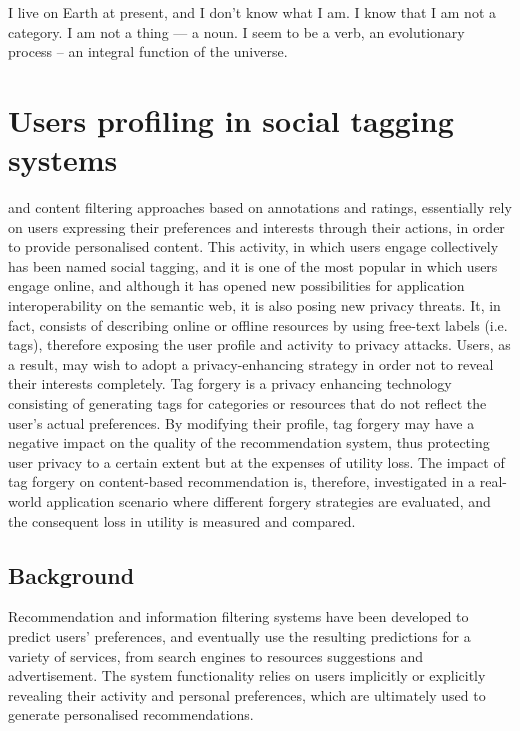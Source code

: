 \begin{savequote}[75mm] 
I live on Earth at present, and I don’t know what I am. I know that I am not a category. I am not a thing — a noun. I seem to be a verb, an evolutionary process – an integral function of the universe.
\end{savequote}

\chapter{Users profiling in social tagging systems}

 and content filtering approaches based on annotations and ratings, essentially rely on users expressing their preferences and interests through their actions, in order to provide personalised content. This activity, in which users engage collectively has been named social tagging, and it is one of the most popular in which users engage online, and although it has opened new possibilities for application interoperability on the semantic web, it is also posing new privacy threats. It, in fact, consists of describing online or offline resources by using free-text labels (i.e. tags), therefore exposing the user profile and activity to privacy attacks. Users, as a result, may wish to adopt a privacy-enhancing strategy in order not to reveal their interests completely. Tag forgery is a privacy enhancing technology consisting of generating tags for categories or resources that do not reflect the user's actual preferences. By modifying their profile, tag forgery may have a negative impact on the quality of the recommendation system, thus protecting user privacy to a certain extent but at the expenses of utility loss. The impact of tag forgery on content-based recommendation is, therefore, investigated in a real-world application scenario where different forgery strategies are evaluated, and the consequent loss in utility is measured and compared.

\section{Background}
\noindent
Recommendation and information filtering systems have been developed to predict users' preferences, and eventually use the resulting predictions for a variety of services, from search engines to resources suggestions and advertisement. The system functionality relies on users implicitly or explicitly revealing their activity and personal preferences, which are ultimately used to generate personalised recommendations.

